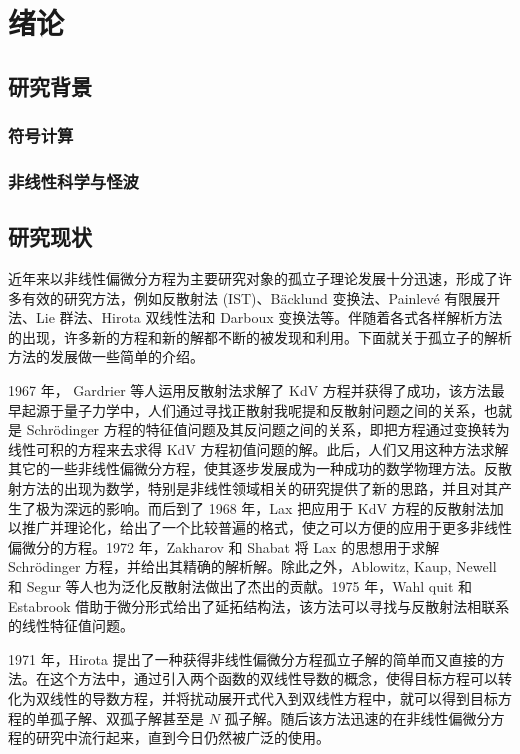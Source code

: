 \chapter{绪论}
\section{研究背景}
\subsection{符号计算}


\subsection{非线性科学与怪波}


\section{研究现状}
近年来以非线性偏微分方程为主要研究对象的孤立子理论发展十分迅速，形成了许多有效的研究方法，例如反散射法 (IST)、B\"{a}cklund 变换法、Painlev\'{e} 有限展开法、Lie 群法、Hirota 双线性法和 Darboux 变换法等。伴随着各式各样解析方法的出现，许多新的方程和新的解都不断的被发现和利用。下面就关于孤立子的解析方法的发展做一些简单的介绍。

1967 年， Gardrier 等人运用反散射法求解了 KdV 方程并获得了成功，该方法最早起源于量子力学中，人们通过寻找正散射我呢提和反散射问题之间的关系，也就是 Schr\"{o}dinger 方程的特征值问题及其反问题之间的关系，即把方程通过变换转为线性可积的方程来去求得 KdV 方程初值问题的解。此后，人们又用这种方法求解其它的一些非线性偏微分方程，使其逐步发展成为一种成功的数学物理方法。反散射方法的出现为数学，特别是非线性领域相关的研究提供了新的思路，并且对其产生了极为深远的影响。而后到了 1968 年，Lax 把应用于 KdV 方程的反散射法加以推广并理论化，给出了一个比较普遍的格式，使之可以方便的应用于更多非线性偏微分的方程。1972 年，Zakharov 和 Shabat 将 Lax 的思想用于求解 Schr\"{o}dinger 方程，并给出其精确的解析解。除此之外，Ablowitz, Kaup, Newell 和 Segur 等人也为泛化反散射法做出了杰出的贡献。1975 年，Wahl quit 和 Estabrook 借助于微分形式给出了延拓结构法，该方法可以寻找与反散射法相联系的线性特征值问题。

1971 年，Hirota 提出了一种获得非线性偏微分方程孤立子解的简单而又直接的方法。在这个方法中，通过引入两个函数的双线性导数的概念，使得目标方程可以转化为双线性的导数方程，并将扰动展开式代入到双线性方程中，就可以得到目标方程的单孤子解、双孤子解甚至是 $N$ 孤子解。随后该方法迅速的在非线性偏微分方程的研究中流行起来，直到今日仍然被广泛的使用。




